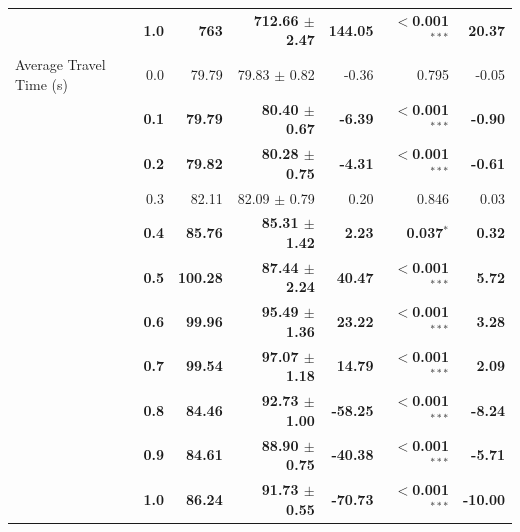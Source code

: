 \documentclass[12pt]{article}
\begin{document}
\begin{table}[H]
\begin{tabular}{lrrrrrr}
 & {\boldmath\bfseries 1.0} & {\boldmath\bfseries 763} & {\boldmath\bfseries 712.66 $\pm$ 2.47} & {\boldmath\bfseries 144.05} & {\boldmath\bfseries $<$0.001$^{***}$} & {\boldmath\bfseries 20.37} \\
\addlinespace
Average Travel Time (s) & 0.0 & 79.79 & 79.83 $\pm$ 0.82 & -0.36 & 0.795 & -0.05 \\
 & {\boldmath\bfseries 0.1} & {\boldmath\bfseries 79.79} & {\boldmath\bfseries 80.40 $\pm$ 0.67} & {\boldmath\bfseries -6.39} & {\boldmath\bfseries $<$0.001$^{***}$} & {\boldmath\bfseries -0.90} \\
 & {\boldmath\bfseries 0.2} & {\boldmath\bfseries 79.82} & {\boldmath\bfseries 80.28 $\pm$ 0.75} & {\boldmath\bfseries -4.31} & {\boldmath\bfseries $<$0.001$^{***}$} & {\boldmath\bfseries -0.61} \\
 & 0.3 & 82.11 & 82.09 $\pm$ 0.79 & 0.20 & 0.846 & 0.03 \\
 & {\boldmath\bfseries 0.4} & {\boldmath\bfseries 85.76} & {\boldmath\bfseries 85.31 $\pm$ 1.42} & {\boldmath\bfseries 2.23} & {\boldmath\bfseries 0.037$^{*}$} & {\boldmath\bfseries 0.32} \\
 & {\boldmath\bfseries 0.5} & {\boldmath\bfseries 100.28} & {\boldmath\bfseries 87.44 $\pm$ 2.24} & {\boldmath\bfseries 40.47} & {\boldmath\bfseries $<$0.001$^{***}$} & {\boldmath\bfseries 5.72} \\
 & {\boldmath\bfseries 0.6} & {\boldmath\bfseries 99.96} & {\boldmath\bfseries 95.49 $\pm$ 1.36} & {\boldmath\bfseries 23.22} & {\boldmath\bfseries $<$0.001$^{***}$} & {\boldmath\bfseries 3.28} \\
 & {\boldmath\bfseries 0.7} & {\boldmath\bfseries 99.54} & {\boldmath\bfseries 97.07 $\pm$ 1.18} & {\boldmath\bfseries 14.79} & {\boldmath\bfseries $<$0.001$^{***}$} & {\boldmath\bfseries 2.09} \\
 & {\boldmath\bfseries 0.8} & {\boldmath\bfseries 84.46} & {\boldmath\bfseries 92.73 $\pm$ 1.00} & {\boldmath\bfseries -58.25} & {\boldmath\bfseries $<$0.001$^{***}$} & {\boldmath\bfseries -8.24} \\
 & {\boldmath\bfseries 0.9} & {\boldmath\bfseries 84.61} & {\boldmath\bfseries 88.90 $\pm$ 0.75} & {\boldmath\bfseries -40.38} & {\boldmath\bfseries $<$0.001$^{***}$} & {\boldmath\bfseries -5.71} \\
 & {\boldmath\bfseries 1.0} & {\boldmath\bfseries 86.24} & {\boldmath\bfseries 91.73 $\pm$ 0.55} & {\boldmath\bfseries -70.73} & {\boldmath\bfseries $<$0.001$^{***}$} & {\boldmath\bfseries -10.00} \\

\end{tabular}
\end{table}
\end{document}
